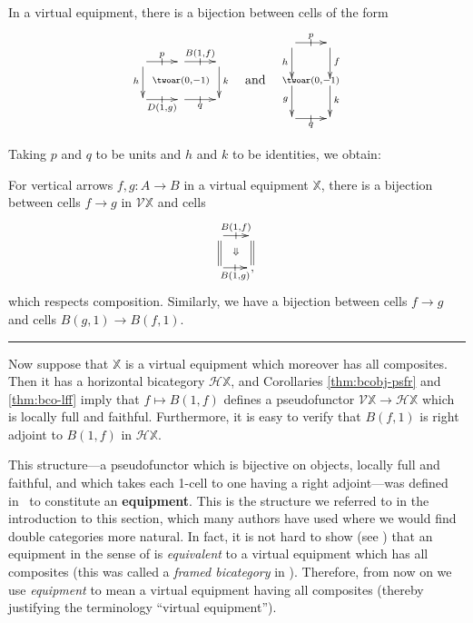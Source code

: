 \documentclass{tac}
\makeatletter
\newcommand{\calV}{\ensuremath{\mathcal{V}}}
\newcommand{\calH}{\ensuremath{\mathcal{H}}}
\newcommand{\qed}{\ \hfill \rule{1ex}{1ex}}
\newcommand{\maps}{\colon}
\numberwithin{equation}{section}
\def\currthmtype{}
\let\old@label\label
\def\label#1{%
    {\let\your@currentlabel\@currentlabel%
      \edef\@currentlabel{\currthmtype}%
      \old@label{label@name@#1}}%
    \old@label{#1}}
\makeatother
\begin{document}
\begin{corollary}\label{thm:companion-mates}
  In a virtual equipment, there is a bijection between cells of the
  form
  \[\vcenter{\xymatrix{
      \ar[r]|-@{|}^{p}\ar[d]_h \ar@{}[drr]|{{\twoar(0,-1)}}&
      \ar[r]|-@{|}^{B(1,f)}  &
      \ar[d]^k\\
      \ar[r]|-@{|}_{D(1,g)} &
      \ar[r]|-@{|}_{q} &
    }}\quad\text{and}\quad
  \vcenter{\xymatrix{
      \ar[r]|-@{|}^{p}\ar[d]_h \ar@{}[ddr]|{{\twoar(0,-1)}} &
      \ar[d]^f\\
      \ar[d]_g &
      \ar[d]^k\\
      \ar[r]|-@{|}_{q} &
    }}
  \]
\end{corollary}

Taking $p$ and $q$ to be units and $h$ and $k$ to be identities, we
obtain:

\begin{corollary}\label{thm:bco-lff}
  For vertical arrows $f,g\maps A\to B$ in a virtual equipment
  $\mathbb{X}$, there is a bijection between cells $f\to g$ in
  $\calV\mathbb{X}$ and cells
  \[\xymatrix@-.5pc{ \ar[r]|-@{|}^-{B(1,f)} \ar@{=}[d] \ar@{}[dr]|{\Downarrow} &  \ar@{=}[d]\\
    \ar[r]|-@{|}_-{B(1,g)} & ,}\]
  which respects
  composition.  Similarly, we have a bijection between cells $f\to
  g$ and cells $B(g,1) \to B(f,1)$.\qed
\end{corollary}

Now suppose that $\mathbb{X}$ is a virtual equipment which moreover
has all composites.  Then it has a horizontal bicategory
$\calH\mathbb{X}$, and Corollaries \ref{thm:bcobj-psfr} and
\ref{thm:bco-lff} imply that $f\mapsto B(1,f)$ defines a pseudofunctor
$\calV\mathbb{X}\to\calH\mathbb{X}$ which is locally full and
faithful.  Furthermore, it is easy to verify that $B(f,1)$ is right
adjoint to $B(1,f)$ in $\calH\mathbb{X}$.

This structure---a pseudofunctor which is bijective on objects,
locally full and faithful, and which takes each 1-cell to one having a
right adjoint---was defined in~\cite{wood:proarrows-i} to constitute
an \textbf{equipment}.  This is the structure we referred to in the
introduction to this section, which many authors have used where we
would find double categories more natural.  In fact, it is not hard to
show (see \cite[Appendix C]{FramedBicats}) that an equipment in the
sense of \cite{wood:proarrows-i} is \emph{equivalent} to a virtual
equipment which has all composites (this was called a \emph{framed
  bicategory} in \cite{FramedBicats}).  Therefore, from now on we use
\emph{equipment} to mean a virtual equipment having all composites
(thereby justifying the terminology ``virtual equipment'').
\end{document}
